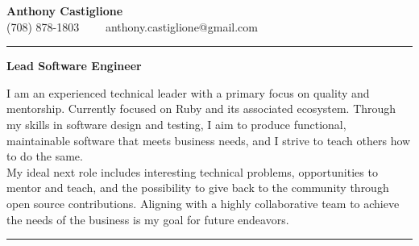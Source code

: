 \documentclass[10pt,letterpaper]{article}
\begin{document}
\begin{center}
  {\LARGE \textbf {Anthony Castiglione}} \\ (708) 878-1803 \ \ \textbullet \ \ anthony.castiglione@gmail.com
\end{center}
\hrule
\begin{center}
  {\Large \textbf {Lead Software Engineer}}
\end{center}
\par I am an experienced technical leader with a primary focus on quality and mentorship. Currently focused on Ruby and its associated ecosystem. Through my skills in software design and testing, I aim to produce functional, maintainable software that meets business needs, and I strive to teach others how to do the same.
\noindent \mbox{}\\

My ideal next role includes interesting technical problems, opportunities to mentor and teach, and the possibility to give back to the community through open source contributions. Aligning with a highly collaborative team to achieve the needs of the business is my goal for future endeavors.

\vspace{0.2in}
\hrule
\vspace{0.2in}

\end{document}
